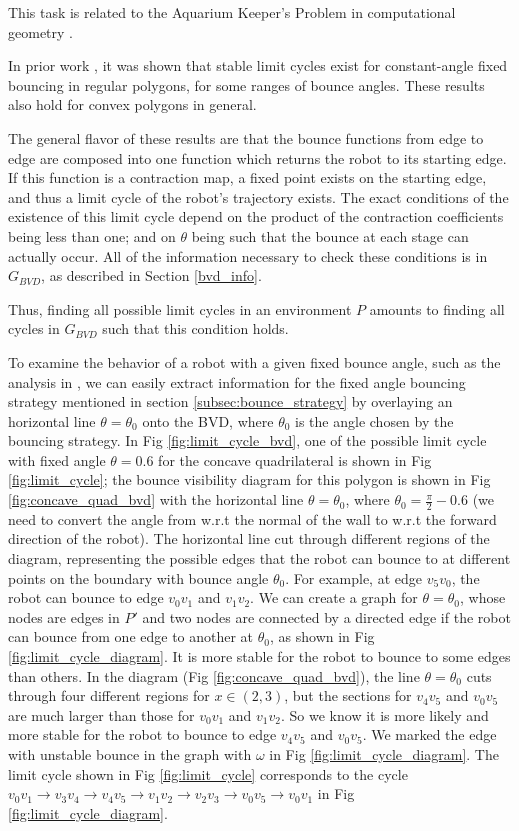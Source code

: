 \documentclass[]{article}  %
\begin{document}
This task is related to the Aquarium Keeper's Problem in computational
geometry \cite{czyzowicz1991aquarium}.

In prior work \cite{NilBecLav17}, it was shown that stable limit cycles
exist for constant-angle fixed bouncing in regular polygons, for some ranges of bounce angles.
These results also hold for convex polygons in general.

The general flavor of these results are that the bounce functions from edge to
edge are composed into one function which returns the robot to its starting
edge. If this function is a contraction map, a fixed point exists on the
starting edge, and thus a limit cycle of the robot's trajectory exists. The
exact conditions of the existence of this limit cycle depend on the product of
the contraction coefficients being less than one; and on $\theta$ being such
that the bounce at each stage can actually occur. All of the information
necessary to check these conditions is in $G_{BVD}$, as described in Section
\ref{bvd_info}.

Thus, finding all possible limit cycles in an environment $P$ amounts to finding
all cycles in $G_{BVD}$ such that this condition holds.

To examine the behavior of a robot with a given fixed bounce angle, such as the
analysis in \cite{ErLav13}, we can easily extract information for the fixed angle bouncing strategy
mentioned in section \ref{subsec:bounce_strategy} by overlaying an horizontal
line $\theta = \theta_0$ onto the BVD, where $\theta_0$ is the angle chosen by
the bouncing strategy. In Fig \ref{fig:limit_cycle_bvd}, one of the possible
limit cycle with fixed angle $\theta = 0.6$ for the concave quadrilateral is
shown in Fig \ref{fig:limit_cycle}; the bounce visibility diagram for this
polygon is shown in Fig \ref{fig:concave_quad_bvd} with the horizontal line
$\theta = \theta_0$, where $\theta_0 = \frac{\pi}{2}-0.6$ (we need to convert
the angle from w.r.t the normal of the wall to w.r.t the forward direction of
the robot). The horizontal line cut through different regions of the diagram,
representing the possible edges that the robot can bounce to at different points
on the boundary with bounce angle $\theta_0$. For example, at edge $v_5v_0$, the
robot can bounce to edge $v_0v_1$ and $v_1v_2$. We can create a graph for
$\theta = \theta_0$, whose nodes are edges in $P'$ and two nodes are connected
by a directed edge if the robot can bounce from one edge to another at
$\theta_0$, as shown in Fig \ref{fig:limit_cycle_diagram}. It is more stable
for the robot to bounce to some edges than others. In the diagram
(Fig \ref{fig:concave_quad_bvd}), the line $\theta = \theta_0$ cuts through
four different regions for $x \in (2, 3)$, but the sections for $v_4v_5$ and
$v_0v_5$ are much larger than those for $v_0v_1$ and $v_1v_2$. So we know it is
more likely and more stable for the robot to bounce to edge $v_4v_5$ and
$v_0v_5$. We marked the edge with unstable bounce in the graph with $\omega$ in
Fig \ref{fig:limit_cycle_diagram}. The limit cycle shown in
Fig \ref{fig:limit_cycle} corresponds to the cycle
$v_0v_1\rightarrow v_3v_4\rightarrow v_4v_5 \rightarrow v_1v_2 \rightarrow v_2v_3 \rightarrow v_0v_5 \rightarrow v_0v_1$
in Fig \ref{fig:limit_cycle_diagram}.
\end{document}
